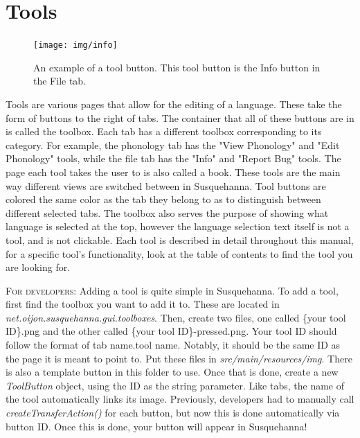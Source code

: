 \documentclass{report}
\begin{document}
	\section{Tools}\label{sec:tools}
	\begin{figure}
		\centering
		\texttt{[image: img/info]}
		\caption{An example of a tool button. This tool button is the Info button in the File tab.}
		\label{fig:tool-button}
	\end{figure}
	Tools are various pages that allow for the editing of a language. These take the form of buttons to the right of tabs. The container that all of these buttons are in is called the toolbox. Each tab has a different toolbox corresponding to its category. For example, the phonology tab has the "View Phonology" and "Edit Phonology" tools, while the file tab has the "Info" and "Report Bug" tools. The page each tool takes the user to is also called a book. These tools are the main way different views are switched between in Susquehanna. Tool buttons are colored the same color as the tab they belong to as to distinguish between different selected tabs. The toolbox also serves the purpose of showing what language is selected at the top, however the language selection text itself is not a tool, and is not clickable. Each tool is described in detail throughout this manual, for a specific tool's functionality, look at the table of contents to find the tool you are looking for.
	\begin{tcolorbox}[width=1\textwidth]
		\textsc{For developers:} Adding a tool is quite simple in Susquehanna. To add a tool, first find the toolbox you want to add it to. These are located in \emph{net.oijon.susquehanna.gui.toolboxes}. Then, create two files, one called \{your tool ID\}.png and the other called \{your tool ID\}-pressed.png. Your tool ID should follow the format of {tab name}.{tool name}. Notably, it should be the same ID as the page it is meant to point to. Put these files in \emph{src/main/resources/img}. There is also a template button in this folder to use. Once that is done, create a new \emph{ToolButton} object, using the ID as the string parameter. Like tabs, the name of the tool automatically links its image. Previously, developers had to manually call \emph{createTransferAction()} for each button, but now this is done automatically via button ID. Once this is done, your button will appear in Susquehanna!
	\end{tcolorbox}
	\par
\end{document}
